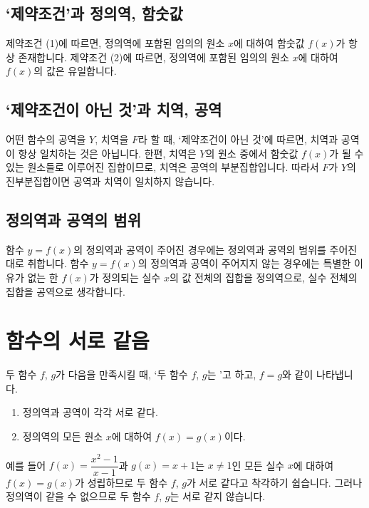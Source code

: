 \subsection{`제약조건'과 정의역, 함숫값}
제약조건 (1)에 따르면, 정의역에 포함된 임의의 원소 $x$에 대하여 함숫값 $f(x)$가 항상 존재합니다. 제약조건 (2)에 따르면, 정의역에 포함된 임의의 원소 $x$에 대하여 $f(x)$의 값은 유일합니다. 


\subsection{`제약조건이 아닌 것'과 치역, 공역}
어떤 함수의 공역을 $Y$, 치역을 $F$라 할 때, `제약조건이 아닌 것'에 따르면, 치역과 공역이 항상 일치하는 것은 아닙니다. 한편, 치역은 $Y$의 원소 중에서 함숫값 $f(x)$가 될 수 있는 원소들로 이루어진 집합이므로, 치역은 공역의 부분집합입니다. 따라서 $F$가 $Y$의 진부분집합이면 공역과 치역이 일치하지 않습니다.

\subsection{정의역과 공역의 범위}
함수 $y=f\left( x \right) $의 정의역과 공역이 주어진 경우에는 정의역과 공역의 범위를 주어진 대로 취합니다. 함수 $y=f\left( x \right) $의 정의역과 공역이 주어지지 않는 경우에는 특별한 이유가 없는 한 $f(x)$가 정의되는 실수 $x$의 값 전체의 집합을 정의역으로, 실수 전체의 집합을 공역으로 생각합니다.
\clearpage
\section{함수의 서로 같음}
두 함수 $f$, $g$가 다음을 만족시킬 때, `두 함수 $f$, $g$는 '고 하고, $f=g$와 같이 나타냅니다.
\begin{justbox}
    \begin{enumerate}[label={\onum*}]
            \item 정의역과 공역이 각각 서로 같다.
            \item 정의역의 모든 원소 $x$에 대하여 $f(x)=g(x)$이다.
        \end{enumerate}
\end{justbox}
예를 들어 $f\left( x \right) =\dfrac{x^2-1}{x-1}$과 $g\left( x \right) =x+1$는 $x\ne1$인 모든 실수 $x$에 대하여 $f\left( x \right)=g\left( x \right)$가 성립하므로 두 함수 $f$, $g$가 서로 같다고 착각하기 쉽습니다. 그러나 정의역이 같을 수 없으므로 두 함수 $f$, $g$는 서로 같지 않습니다.

